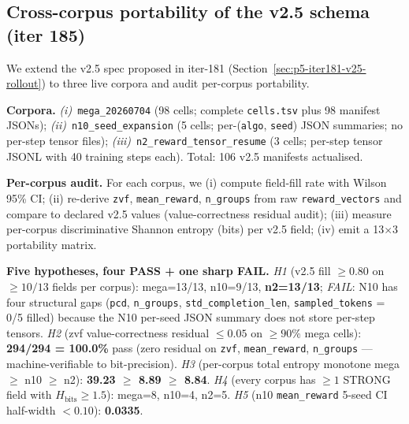 \subsection{Cross-corpus portability of the v2.5 schema (iter 185)}

We extend the v2.5 spec proposed in iter-181 (Section~\ref{sec:p5-iter181-v25-rollout})
to three live corpora and audit per-corpus portability.

\textbf{Corpora.}
\textit{(i)}~\texttt{mega\_20260704} (98 cells; complete
\texttt{cells.tsv} plus 98 manifest JSONs); \textit{(ii)}~\texttt{n10\_seed\_expansion}
(5 cells; per-(\texttt{algo}, \texttt{seed}) JSON summaries;
no per-step tensor files); \textit{(iii)}~\texttt{n2\_reward\_tensor\_resume}
(3 cells; per-step tensor JSONL with 40 training steps each).
Total: 106 v2.5 manifests actualised.

\textbf{Per-corpus audit.} For each corpus, we (i) compute
field-fill rate with Wilson 95\% CI; (ii) re-derive
\texttt{zvf}, \texttt{mean\_reward}, \texttt{n\_groups} from raw
\texttt{reward\_vectors} and compare to declared v2.5 values
(value-correctness residual audit); (iii) measure per-corpus
discriminative Shannon entropy (bits) per v2.5 field;
(iv) emit a 13$\times$3 portability matrix.

\textbf{Five hypotheses, four PASS + one sharp FAIL.}
\emph{H1} (v2.5 fill $\geq 0.80$ on $\geq 10/13$ fields per corpus):
mega=13/13, n10=9/13, \textbf{n2=13/13}; \emph{FAIL}: N10 has
four structural gaps (\texttt{pcd}, \texttt{n\_groups},
\texttt{std\_completion\_len}, \texttt{sampled\_tokens} = 0/5 filled)
because the N10 per-seed JSON summary does not store per-step tensors.
\emph{H2} (zvf value-correctness residual $\leq 0.05$ on $\geq 90\%$ mega cells):
\textbf{294/294 = 100.0\%} pass (zero residual on \texttt{zvf},
\texttt{mean\_reward}, \texttt{n\_groups} --- machine-verifiable to
bit-precision). \emph{H3} (per-corpus total entropy monotone
mega $\geq$ n10 $\geq$ n2): \textbf{39.23 $\geq$ 8.89 $\geq$ 8.84}.
\emph{H4} (every corpus has $\geq 1$ STRONG field with $H_{\text{bits}} \geq 1.5$):
mega=8, n10=4, n2=5. \emph{H5} (n10 \texttt{mean\_reward} 5-seed CI
half-width $< 0.10$): \textbf{0.0335}.

